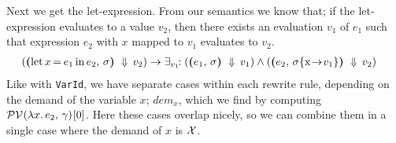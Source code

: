 \documentclass[../main.tex]{subfiles}
\begin{document}
\newpage
Next we get the let-expression.
From our semantics we know that; if the let-expression evaluates to a value $v_2$, then there exists an evaluation $v_1$ of $e_1$ such that expression $e_2$ with $x$ mapped to $v_1$ evaluates to $v_2$.
\begin{align*}
    \left( \sempairb{\letexpr{x}{e_1}{e_2}} \DownA v_2 \right)
        &\to \exists_{v_1}\hspace{-4pt}: \left( \sempairb{e_1} \DownA v_1 \right)
            \wedge \left( \sempairb[\envmap{\sigma}{x}{v_1}]{e_2} \DownA v_2 \right)
\end{align*}
%
Like with \texttt{VarId}, we have separate cases within each rewrite rule, depending on the demand of the variable $x$; $dem_x$, which we find by computing $\mathcal{PV}\hspace{-1.2pt} \left( \lambda x.\, e_2,\, \gamma \right) \hspace{-1pt}[0]$. Here these cases overlap nicely, so we can combine them in a single case where the demand of $x$ is $\mathcal{X}$.
\end{document}
